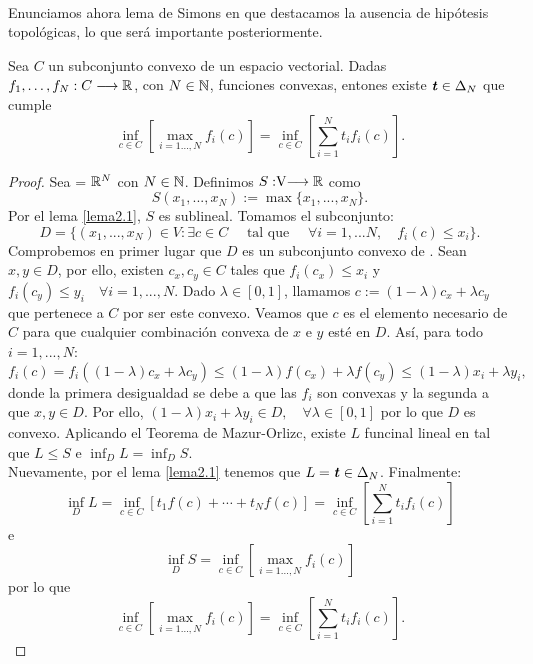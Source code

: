 	\paragraph{} Enunciamos ahora lema de Simons \cite{Simons2008} en que destacamos la ausencia de hipótesis topológicas, lo que será importante posteriormente.
	
	\begin{lemaBox}\label{Simons}
		Sea $ C $ un subconjunto convexo de un espacio vectorial. Dadas $ f_1, \dots, f_N : C \longrightarrow \mathbb{R} $, con $ N \in \mathbb{N} $, funciones convexas, entones existe $ \textbf{\emph{t}} \in \Delta_N $ que cumple
		\[
		\inf_{c \in C}\left[ \max_{i=1\dots,N } f_i(c)\right] = \inf_{c \in C} \left[ \sum_{i=1}^{N} t_i f_i(c) \right].
		\] 
	\end{lemaBox}
	\begin{proof}
		Sea  \vecSpace = $ \mathbb{R}^N $ con $ N \in \mathbb{N} $. Definimos $S:\vecSpace \longrightarrow \RR $ como \[ S(x_1, ..., x_N) := \max \{x_1, ..., x_N\}. \] Por el lema \ref{lema2.1}, $ S $ es sublineal. Tomamos el subconjunto:
		\[ 
		D = \{ (x_1, ..., x_N)\in V: \exists c \in C \quad \text{ tal que } \quad \forall i = 1,...N,\quad f_i(c) \leq x_i \}.
		\]
		Comprobemos en primer lugar que $ D $ es un subconjunto convexo de \vecSpace. Sean $ x, y \in D $, por ello, existen $ c_x, c_y \in C $ tales que $ f_i (c_x) \leq x_i  $ y $ f_i (c_y) \leq y_i \quad \forall i=1,...,N $. Dado $ \lambda \in [0,1] $, llamamos $ c := (1-\lambda)c_x + \lambda c_y $ que pertenece a $ C $ por ser este convexo. Veamos que $ c $ es el elemento necesario de $ C $ para que cualquier combinación convexa de $ x $ e $ y $ esté en $ D $. Así, para todo $ i =1,...,N  $:	
		\[
		f_i(c) = f_i((1-\lambda)c_x + \lambda c_y) \leq (1-\lambda)f(c_x) + \lambda f(c_y) \leq (1-\lambda)x_i + \lambda y_i ,
		\]
		donde la primera desigualdad se debe a que las $ f_i $ son convexas y la segunda a que $ x,y \in D $. Por ello, $ (1-\lambda)x_i + \lambda y_i \in D , \quad \forall \lambda \in [0,1] $ por lo que $ D $ es convexo. Aplicando el Teorema de Mazur-Orlizc, existe $ L $ funcinal lineal en \vecSpace tal que $ L \leq S $ e $ \inf_D L = \inf_D S $. \\
		
		Nuevamente, por el lema \ref{lema2.1} tenemos que $ L = \textbf{\emph{t}} \in \Delta_N$. Finalmente:
		\[
		\inf_D L = \inf_{c\in C} \left[ t_1 f(c) + \cdots+ t_N f(c) \right] =\inf_{c \in C} \left[ \sum_{i=1}^{N} t_i f_i(c) \right]
		\]
		e
		\[
		\inf_D S = \inf_{c \in C}\left[ \max_{i=1\dots,N } f_i(c)\right]
		\]
		por lo que 
		\[ \inf_{c \in C}\left[ \max_{i=1\dots,N } f_i(c)\right] = \inf_{c \in C} \left[ \sum_{i=1}^{N} t_i f_i(c) \right]. \] 
	\end{proof}

